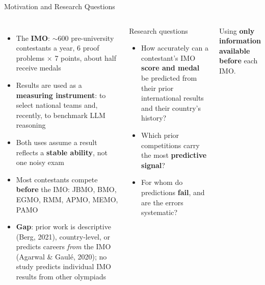 \documentclass[aspectratio=169]{beamer}
\begin{document}
\begin{frame}{Motivation and Research Questions}
  \begin{columns}[T]
      \footnotesize
      \begin{itemize}\setlength{\itemsep}{8pt}
        \item The \textbf{IMO}: $\sim$600 pre-university contestants a year,
              6 proof problems $\times$ 7 points, about half receive medals
        \item Results are used as a \textbf{measuring instrument}: to select
              national teams and, recently, to benchmark LLM reasoning
        \item Both uses assume a result reflects a \textbf{stable ability},
              not one noisy exam
        \item Most contestants compete \textbf{before} the IMO: JBMO, BMO, EGMO,
              RMM, APMO, MEMO, PAMO
        \item \textbf{Gap}: prior work is descriptive (Berg, 2021), country-level,
              or predicts careers \emph{from} the IMO (Agarwal \& Gaulé, 2020);
              no study predicts individual IMO results from other olympiads
      \end{itemize}

      \begin{block}{Research questions}
        \footnotesize
        \begin{itemize}\setlength{\itemsep}{6pt}
          \item[\textbf{RQ1}] How accurately can a contestant's IMO \textbf{score
                and medal} be predicted from their prior international results
                and their country's history?
          \item[\textbf{RQ2}] Which prior competitions carry the most
                \textbf{predictive signal}?
          \item[\textbf{RQ3}] For whom do predictions \textbf{fail}, and are the
                errors systematic?
        \end{itemize}
      \end{block}
      \vspace{4pt}
      \footnotesize Using \textbf{only information available before} each IMO.
  \end{columns}
\end{frame}
\end{document}
